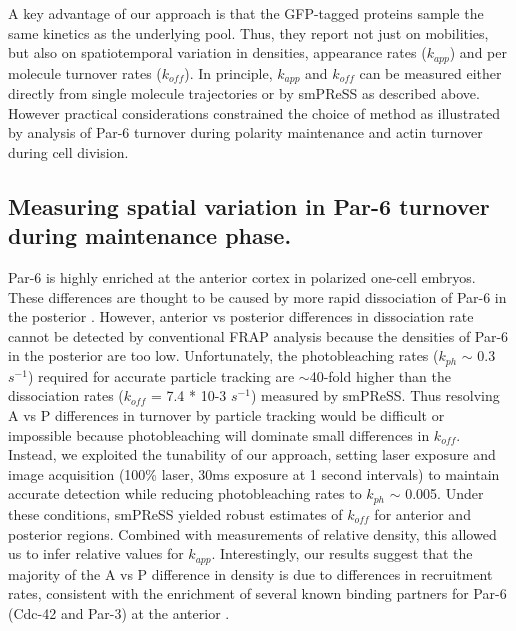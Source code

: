  A key advantage of our approach is that the GFP-tagged proteins sample the same kinetics as the underlying pool. Thus, they report not just on mobilities, but also on spatiotemporal variation in densities, appearance rates ($k_{app}$) and per molecule turnover rates ($k_{off}$). In principle, $k_{app}$ and $k_{off}$ can be measured either directly from single molecule trajectories or by smPReSS as described above. However practical considerations constrained the choice of method as illustrated by analysis of Par-6 turnover during polarity maintenance and actin turnover during cell division.
 
 
 \subsection{Measuring spatial variation in Par-6 turnover during maintenance phase.}
 
 Par-6 is highly enriched at the anterior cortex in polarized one-cell embryos. These differences are thought to be caused by more rapid dissociation of Par-6 in the posterior \cite{nmeth30}. However, anterior vs posterior differences in dissociation rate cannot be detected by conventional FRAP analysis because the densities of Par-6 in the posterior are too low. Unfortunately, the photobleaching rates ($k_{ph}$ $\sim$ 0.3 $s^{-1}$) required for accurate particle tracking are $\sim$40-fold higher than the dissociation rates ($k_{off}$ = 7.4 * 10-3 $s^{-1}$) measured by smPReSS. Thus resolving A vs P differences in turnover by particle tracking would be difficult or impossible because photobleaching will dominate small differences in $k_{off}$. Instead, we exploited the tunability of our approach, setting laser exposure and image acquisition (100\% laser, 30ms exposure at 1 second intervals) to maintain accurate detection while reducing photobleaching rates to $k_{ph}$ $\sim$ 0.005. Under these conditions, smPReSS yielded robust estimates of $k_{off}$ for anterior and posterior regions. Combined with measurements of relative density, this allowed us to infer relative values for $k_{app}$. Interestingly, our results suggest that the majority of the A vs P difference in density is due to differences in recruitment rates, consistent with the enrichment of several known binding partners for Par-6 (Cdc-42 and Par-3) at the anterior \cite{nmeth31,nmeth22}.
 
 
 
